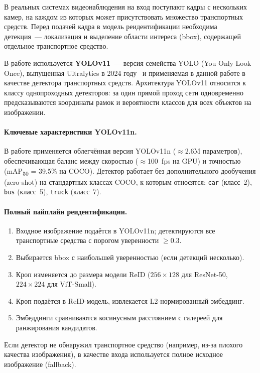В реальных системах видеонаблюдения на вход поступают кадры с нескольких камер, на каждом из которых может присутствовать множество транспортных средств. Перед подачей кадра в модель реидентификации необходима детекция~--- локализация и выделение области интереса (bbox), содержащей отдельное транспортное средство.

В работе используется \textbf{YOLOv11}~--- версия семейства YOLO (You Only Look Once), выпущенная Ultralytics в 2024 году~\cite{ultralytics2024yolo11} и применяемая в данной работе в качестве детектора транспортных средств. Архитектура YOLOv11 относится к классу однопроходных детекторов: за один прямой проход сети одновременно предсказываются координаты рамок и вероятности классов для всех объектов на изображении.

\paragraph{Ключевые характеристики YOLOv11n.} В работе применяется облегчённая версия YOLOv11n ($\approx$2.6M параметров), обеспечивающая баланс между скоростью ($\approx$100~fps на GPU) и точностью (mAP\textsubscript{50} = 39.5\% на COCO). Детектор работает без дополнительного дообучения (zero-shot) на стандартных классах COCO, к которым относятся: \texttt{car} (класс~2), \texttt{bus} (класс~5), \texttt{truck} (класс~7).

\paragraph{Полный пайплайн реидентификации.}
\begin{enumerate}
  \item Входное изображение подаётся в YOLOv11n; детектируются все транспортные средства с порогом уверенности $\geq 0.3$.
  \item Выбирается bbox с наибольшей уверенностью (если детекций несколько).
  \item Кроп изменяется до размера модели ReID ($256\times128$ для ResNet-50, $224\times224$ для ViT-Small).
  \item Кроп подаётся в ReID-модель, извлекается L2-нормированный эмбеддинг.
  \item Эмбеддинги сравниваются косинусным расстоянием с галереей для ранжирования кандидатов.
\end{enumerate}

Если детектор не обнаружил транспортное средство (например, из-за плохого качества изображения), в качестве входа используется полное исходное изображение (fallback).

